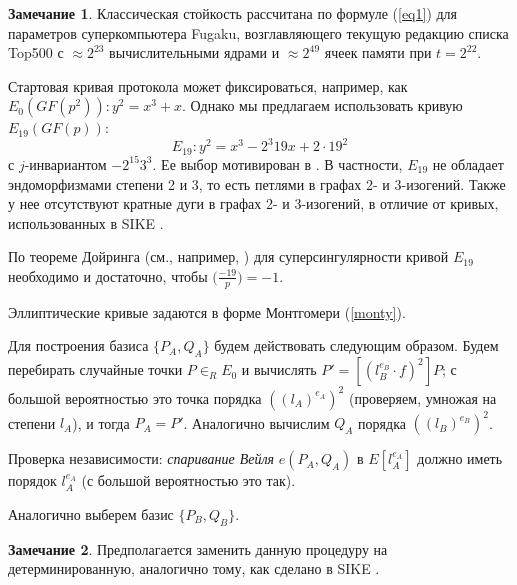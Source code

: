 \documentclass[a4paper,12pt]{article}
\theoremstyle{definition}
\newtheorem{remark}{Замечание}
\begin{document}
\begin{remark}
 Классическая стойкость рассчитана по формуле (\ref{eq1}) для параметров суперкомпьютера Fugaku, возглавляющего текущую редакцию списка Top500 \cite{Top500} с $\approx 2^{23}$ вычислительными ядрами
 и $\approx 2^{49}$ ячеек памяти при $t=2^{22}$.
\end{remark}


% 


Стартовая кривая протокола может фиксироваться, например, как $E_0(GF(p^2)): y^2=x^3+x$. %
Однако мы предлагаем использовать кривую   $E_{19}(GF(p))$:
\begin{equation}
E_{19}\!: y^2 = x^3 - 2^3 19 x + 2 \!\cdot\! 19^2
\end{equation}
с $j$-инвариантом $-2^{15} 3^3$. Ее выбор мотивирован в \cite{StartingCurve}. В частности,  $E_{19}$ не обладает эндоморфизмами степени 2 и 3, то есть петлями в
графах 2- и 3-изогений.  Также у  нее отсутствуют кратные дуги в графах 2- и 3-изогений, в отличие от   кривых, использованных в SIKE \cite{SIKE}.
 
По теореме Дойринга (см., например, \cite[Теорема 2.1]{broker}) для суперсингулярности кривой $E_{19}$ необходимо и достаточно, чтобы $\big(\frac{-19}{p}\big) = -1$. %

Эллиптические кривые задаются   в форме Монтгомери (\ref{monty}).

Для построения базиса $\{P_A,Q_A\}$ будем действовать следующим образом.
Будем перебирать случайные точки   $P\in_R E_0$ и вычислять $P'=[(l_B ^{e_B}\cdot f)^2]P$; с большой вероятностью это точка порядка $((l_A)^{e_A})^2$ (проверяем, умножая на степени $l_A$), и тогда
 $P_A=P'$.
 Аналогично вычислим $Q_A$ порядка $((l_B)^{e_B})^2$. 
 
 Проверка независимости: \emph{спаривание Вейля} $e(P_A,Q_A)$ в $E[l_A^{e_A}]$ должно иметь порядок $l_A^{e_A}$ (с большой вероятностью это так).
 
Аналогично выберем базис $\{P_B,Q_B\}$.

\begin{remark}
 Предполагается заменить данную процедуру на детерминированную, аналогично тому, как сделано в SIKE \cite{SIKE}.
\end{remark}
\end{document}
